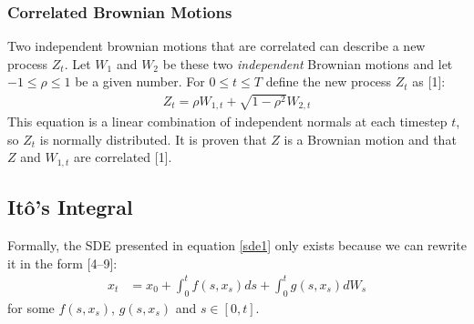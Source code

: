 \documentclass[12pt,twoside]{reedthesis}
\theoremstyle{definition}
\theoremstyle{definition}
\theoremstyle{remark}
\begin{document}
  \subsubsection{Correlated Brownian Motions}\label{corr}
  
  Two independent brownian motions that are correlated can describe a new
  process \(Z_t\). Let \(W_1\) and \(W_2\) be these two \emph{independent}
  Brownian motions and let \(-1 \leq \rho \leq 1\) be a given number. For
  \(0 \leq t \leq T\) define the new process \(Z_t\) as {[}1{]}:
  \begin{align}
  \label{eq:corr_brow}
  Z_t = \rho W_{1,t} + \sqrt{1-\rho^2}W_{2,t}
  \end{align}
  \noindent
  This equation is a linear combination of independent normals at each
  timestep \(t\), so \(Z_t\) is normally distributed. It is proven that
  \(Z\) is a Brownian motion and that \(Z\) and \(W_{1,t}\) are correlated
  {[}1{]}.
  
  \subsection{Itô's Integral}\label{itos-integral}
  
  Formally, the SDE presented in equation \ref{sde1} only exists because
  we can rewrite it in the form {[}4--9{]}:
  \begin{align} \label{sde1}
  x_t &= x_0 + \int_{0}^{t}{f(s, x_s)ds} + \int_{0}^{t}{g(s, x_s)dW_s}
  \end{align}
  \noindent
  for some \(f(s, x_s)\), \(g(s, x_s)\) and \(s \in [0,t]\).
  
\end{document}
